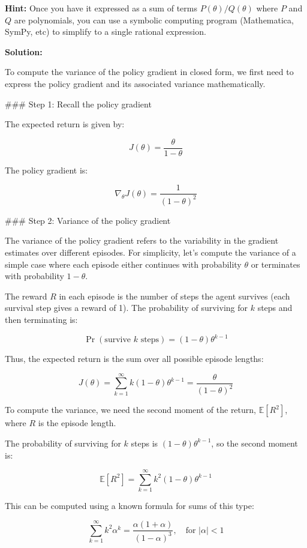 \documentclass{article}
\begin{document}
\begin{enumerate}
\textbf{Hint:}  Once you have it expressed as a sum of terms $P(\theta)/Q(\theta)$ where $P$ and $Q$ are polynomials, you can use a symbolic computing program (Mathematica, SymPy, etc) to simplify to a single rational expression.

\textbf{Solution:}

To compute the variance of the policy gradient in closed form, we first need to express the policy gradient and its associated variance mathematically.

### Step 1: Recall the policy gradient

The expected return is given by:

\[
J(\theta) = \frac{\theta}{1 - \theta}
\]

The policy gradient is:

\[
\nabla_\theta J(\theta) = \frac{1}{(1 - \theta)^2}
\]

### Step 2: Variance of the policy gradient

The variance of the policy gradient refers to the variability in the gradient estimates over different episodes. For simplicity, let’s compute the variance of a simple case where each episode either continues with probability \( \theta \) or terminates with probability \( 1 - \theta \).

The reward \( R \) in each episode is the number of steps the agent survives (each survival step gives a reward of 1). The probability of surviving for \( k \) steps and then terminating is:

\[
\Pr(\text{survive } k \text{ steps}) = (1 - \theta)\theta^{k-1}
\]

Thus, the expected return is the sum over all possible episode lengths:

\[
J(\theta) = \sum_{k=1}^{\infty} k (1 - \theta) \theta^{k-1} = \frac{\theta}{(1 - \theta)^2}
\]

To compute the variance, we need the second moment of the return, \( \mathbb{E}[R^2] \), where \( R \) is the episode length.

The probability of surviving for \( k \) steps is \( (1 - \theta) \theta^{k-1} \), so the second moment is:

\[
\mathbb{E}[R^2] = \sum_{k=1}^{\infty} k^2 (1 - \theta) \theta^{k-1}
\]

This can be computed using a known formula for sums of this type:

\[
\sum_{k=1}^{\infty} k^2 \alpha^k = \frac{\alpha(1 + \alpha)}{(1 - \alpha)^3}, \quad \text{for } |\alpha| < 1
\]


\end{enumerate}
\end{document}
